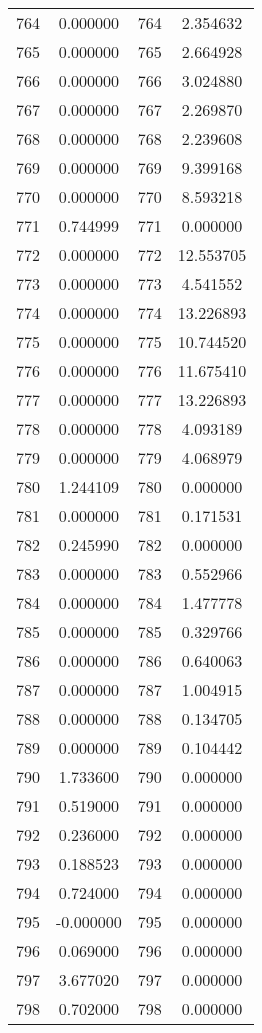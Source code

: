 \documentclass[12pt]{article}
\begin{document}
\begin{longtable}{@{}cccc@{}}
764 & 0.000000 & 764 & 2.354632 \\
765 & 0.000000 & 765 & 2.664928 \\
766 & 0.000000 & 766 & 3.024880 \\
767 & 0.000000 & 767 & 2.269870 \\
768 & 0.000000 & 768 & 2.239608 \\
769 & 0.000000 & 769 & 9.399168 \\
770 & 0.000000 & 770 & 8.593218 \\
771 & 0.744999 & 771 & 0.000000 \\
772 & 0.000000 & 772 & 12.553705 \\
773 & 0.000000 & 773 & 4.541552 \\
774 & 0.000000 & 774 & 13.226893 \\
775 & 0.000000 & 775 & 10.744520 \\
776 & 0.000000 & 776 & 11.675410 \\
777 & 0.000000 & 777 & 13.226893 \\
778 & 0.000000 & 778 & 4.093189 \\
779 & 0.000000 & 779 & 4.068979 \\
780 & 1.244109 & 780 & 0.000000 \\
781 & 0.000000 & 781 & 0.171531 \\
782 & 0.245990 & 782 & 0.000000 \\
783 & 0.000000 & 783 & 0.552966 \\
784 & 0.000000 & 784 & 1.477778 \\
785 & 0.000000 & 785 & 0.329766 \\
786 & 0.000000 & 786 & 0.640063 \\
787 & 0.000000 & 787 & 1.004915 \\
788 & 0.000000 & 788 & 0.134705 \\
789 & 0.000000 & 789 & 0.104442 \\
790 & 1.733600 & 790 & 0.000000 \\
791 & 0.519000 & 791 & 0.000000 \\
792 & 0.236000 & 792 & 0.000000 \\
793 & 0.188523 & 793 & 0.000000 \\
794 & 0.724000 & 794 & 0.000000 \\
795 & -0.000000 & 795 & 0.000000 \\
796 & 0.069000 & 796 & 0.000000 \\
797 & 3.677020 & 797 & 0.000000 \\
798 & 0.702000 & 798 & 0.000000 \\

\end{longtable}
\end{document}

